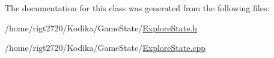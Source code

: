 The documentation for this class was generated from the following files\-:\begin{DoxyCompactItemize}
\item 
/home/rigt2720/\-Kodika/\-Game\-State/\hyperlink{ExploreState_8h}{Explore\-State.\-h}\item 
/home/rigt2720/\-Kodika/\-Game\-State/\hyperlink{ExploreState_8cpp}{Explore\-State.\-cpp}\end{DoxyCompactItemize}
